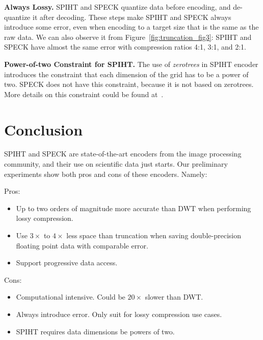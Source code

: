 \documentclass[review]{vgtc}                 %
\newenvironment{tightItemize}{
\begin{itemize}
        \setlength{\itemsep}{1pt}
        \setlength{\parskip}{0pt}
        \setlength{\parsep}{0pt}
}{\end{itemize}
}
\begin{document}
\textbf{Always Lossy.}
%
SPIHT and SPECK quantize data before encoding,
and de-quantize it after decoding.
%
These steps make SPIHT and SPECK always introduce some error,
even when encoding to a target size that is the same as the raw data.
%
We can also observe it from Figure~\ref{fig:truncation_fig3}:
SPIHT and SPECK have almost the same error with compression ratios
4:1, 3:1, and 2:1.

\textbf{Power-of-two Constraint for SPIHT.}
%
The use of \textit{zerotrees} in SPIHT encoder introduces the constraint that
each dimension of the grid has to be a power of two.
%
SPECK does not have this constraint, because it is not based on zerotrees.
%
More details on this constraint could be found at~\cite{qcc1}.


\section{Conclusion}
%
SPIHT and SPECK are state-of-the-art encoders from the image processing
community, and their use on scientific data just starts.
%
Our preliminary experiments show both pros and cons of these encoders. 
Namely:

Pros:
\begin{tightItemize}
    \item Up to two orders of magnitude more accurate than DWT
          when performing lossy compression.
    \item Use $3\times$ to $4\times$ less space than truncation
          when saving double-precision floating point data with
          comparable error.
    \item Support progressive data access. 
\end{tightItemize}

Cons:
\begin{tightItemize}
    \item Computational intensive. Could be $20\times$ slower than DWT.
    \item Always introduce error. Only suit for lossy compression use cases.
    \item SPIHT requires data dimensions be powers of two.
\end{tightItemize}




\end{document}

